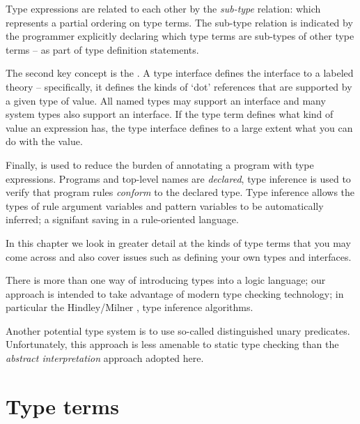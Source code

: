 Type expressions are related to each other by the \emph{sub-type} relation: which represents a partial ordering on type terms. The sub-type relation is indicated by the programmer explicitly declaring which type terms are sub-types of other type terms -- as part of type definition statements.

The second key concept is the . A type interface defines the interface to a labeled theory -- specifically, it defines the kinds of `dot' references that are supported by a given type of value. All named types may support an interface and many system types also support an interface. If the type term defines what kind of value an expression has, the type interface defines to a large extent what you can do with the value.

Finally,  is used to reduce the burden of annotating a program with type expressions. Programs and top-level names are \emph{declared}, type inference is used to verify that program rules \emph{conform} to the declared type. Type inference allows the types of rule argument variables and pattern variables to be automatically inferred; a signifant saving in a rule-oriented language.

In this chapter we look in greater detail at the kinds of type terms that you may come across and also cover issues such as defining your own types and interfaces.

\begin{aside}
There is more than one way of introducing types into a logic language; our approach is intended to take advantage of modern type checking technology; in particular the Hindley/Milner \cite{hindley:69}, \cite{milner:78} type inference algorithms.

Another potential type system is to use so-called distinguished unary predicates. Unfortunately, this approach is less amenable to static type checking than the \emph{abstract interpretation} approach adopted here.
\end{aside}

\section{Type terms}
\label{type:term}

